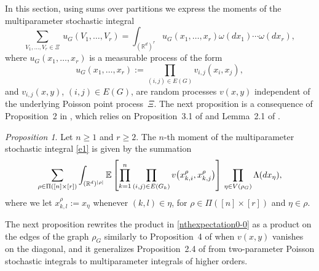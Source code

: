 \documentclass[bj,authoryear,noshowframe]{imsart}
\theoremstyle{plain}
\theoremstyle{remark}
\newcommand{\E}{\mathbb{E}}
\newcommand{\R}{\mathbb{R}}
\def\real{{\mathord{\mathbb R}}}
\newtheorem{prop}{Proposition}[section]
\begin{document}
 
  In this section, using sums over partitions
  we express the moments of the multiparameter stochastic integral 
 \begin{equation}
 \label{e1}
  \sum_{V_1,\dots,V_r \in\Xi} \ u_G (V_1,\ldots , V_r ) 
  = \int_{(\real^d)^r} u_G (x_1,\ldots , x_r ) \omega (dx_1)\cdots \omega (dx_r), 
 \end{equation} 
  where $u_G (x_1,\ldots , x_r )$ is a measurable process of the form 
 $$
  u_G (x_1,\ldots , x_r ) := \prod_{(i,j) \in E(G)} v_{i,j}(x_i,x_j), 
 $$
  and $v_{i,j}(x,y)$, $(i,j)\in E(G)$,
  are random processes $v(x,y)$
  independent of the underlying Poisson point process~$\Xi$. 
  The next proposition is a consequence of Proposition~2 in \cite{prkhp}, 
 which relies on Proposition~3.1 of \cite{momentpoi} %
 and Lemma~2.1 of \cite{bogdan}. 
 
  \vspace{-0.2cm}
 
 \begin{prop}
 \label{p01-1-0} 
 Let $n \geq 1$ and $r\geq 2$. 
 The $n$-th moment of the multiparameter stochastic integral
  \eqref{e1} is given by the summation 
 \begin{equation} 
 \label{nthexpectation0-0} 
 \sum_{\rho \in \Pi ( [n] \times [r] )}
 \int_{(\R^d )^{|\rho |}}
 \E \left[
   \prod_{k=1}^n
 \prod_{%
 (i,j)\in E(G_k)}
 v\big(x^\rho_{k,i},x^\rho_{k,j}\big) %
 \right] 
    \ \! \prod_{\eta \in V(\rho_G)}
    \Lambda(dx_\eta ),
 \end{equation}
  where we let $x_{k,l}^\rho:=x_\eta$ whenever $(k,l)\in \eta$,
  for $\rho \in \Pi([n]\times [r])$ and $\eta\in\rho$.
 \end{prop}
  The next proposition rewrites the product in \eqref{nthexpectation0-0} 
  as a product on the edges of the graph $\rho_G$ 
  similarly to Proposition~4 of \cite{prkhp} when $v(x,y)$ vanishes on
  the diagonal, and it generalizes
  Proposition~2.4 of \cite{jansen}
  from two-parameter Poisson stochastic
  integrals to multiparameter integrals of higher orders. 
 
  \vspace{-0.2cm}
 
\end{document}
